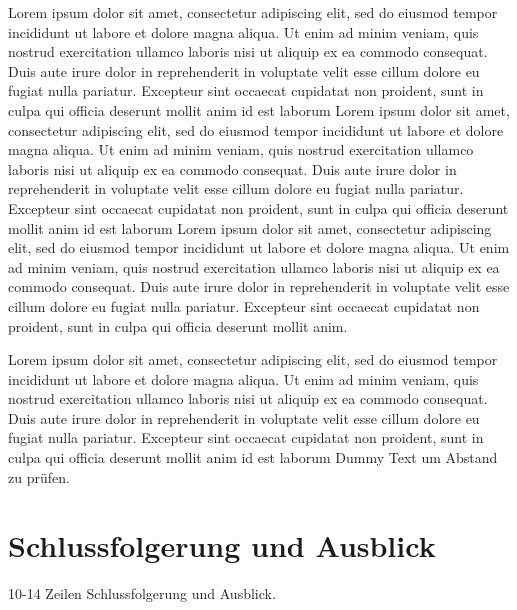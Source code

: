 \documentclass[a4paper, 12pt]{hs_cad_cam_technologie}
\begin{document}
Lorem ipsum dolor sit amet, consectetur adipiscing elit, sed do eiusmod tempor incididunt ut labore et dolore magna aliqua. Ut enim ad minim veniam, quis nostrud exercitation ullamco laboris nisi ut aliquip ex ea commodo consequat. Duis aute irure dolor in reprehenderit in voluptate velit esse cillum dolore eu fugiat nulla pariatur. Excepteur sint occaecat cupidatat non proident, sunt in culpa qui officia deserunt mollit anim id est laborum
Lorem ipsum dolor sit amet, consectetur adipiscing elit, sed do eiusmod tempor incididunt ut labore et dolore magna aliqua. Ut enim ad minim veniam, quis nostrud exercitation ullamco laboris nisi ut aliquip ex ea commodo consequat. Duis aute irure dolor in reprehenderit in voluptate velit esse cillum dolore eu fugiat nulla pariatur. Excepteur sint occaecat cupidatat non proident, sunt in culpa qui officia deserunt mollit anim id est laborum
Lorem ipsum dolor sit amet, consectetur adipiscing elit, sed do eiusmod tempor incididunt ut labore et dolore magna aliqua. Ut enim ad minim veniam, quis nostrud exercitation ullamco laboris nisi ut aliquip ex ea commodo consequat. Duis aute irure dolor in reprehenderit in voluptate velit esse cillum dolore eu fugiat nulla pariatur. Excepteur sint occaecat cupidatat non proident, sunt in culpa qui officia deserunt mollit anim.
\begin{figure}[H]
\end{figure}
Lorem ipsum dolor sit amet, consectetur adipiscing elit, sed do eiusmod tempor incididunt ut labore et dolore magna aliqua. Ut enim ad minim veniam, quis nostrud exercitation ullamco laboris nisi ut aliquip ex ea commodo consequat. Duis aute irure dolor in reprehenderit in voluptate velit esse cillum dolore eu fugiat nulla pariatur. Excepteur sint occaecat cupidatat non proident, sunt in culpa qui officia deserunt mollit anim id est laborum
Dummy Text um Abstand zu prüfen.
\section{Schlussfolgerung und Ausblick}
10-14 Zeilen Schlussfolgerung und Ausblick.



\end{document}

